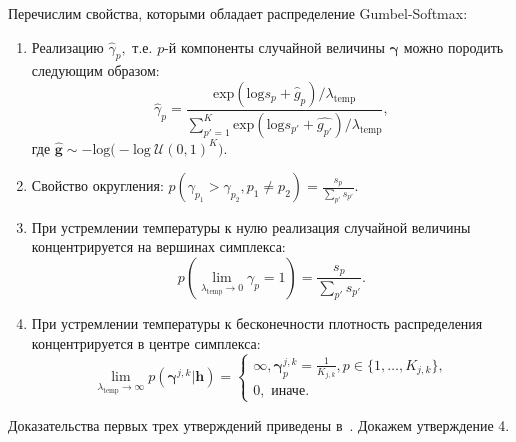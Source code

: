 Перечислим свойства, которыми обладает распределение Gumbel-Softmax:
\begin{enumerate}
\item Реализацию $\hat{\gamma}_p,$ т.е. $p$-й компоненты случайной величины $\boldsymbol{\gamma}$  можно породить следующим образом:
\[
    \hat{\gamma}_p = \frac{\text{exp}(\text{log}s_p+\hat{g}_p)/\lambda_{\text{temp}}}{\sum_{p'=1}^{K}\text{exp}(\text{log}s_{p'}+\hat{g_{p'}})/\lambda_{\text{temp}}},
\]
где $\hat{\mathbf{g}} \sim -\text{log}\bigl(-\text{log}~\mathcal{U}(0,1)^K\bigr).$ 

\item Свойство округления: $p(\gamma_{p_1} > \gamma_{p_2}, p_1\neq p_2) = \frac{s_p}{\sum_{p'}s_{p'}}.$

\item При устремлении температуры к нулю реализация случайной величины концентрируется на вершинах симплекса:
\[
    p(\lim_{\lambda_{\text{temp}} \to 0}  \gamma_{p} = 1)  = \frac{s_p}{\sum_{p'}s_{p'}}.
\]


\item При устремлении температуры к бесконечности плотность распределения концентрируется в центре симплекса:
\begin{equation}
\label{eq:theorem_gs}
    \lim_{\lambda_{\text{temp}} \to \infty}  p(\boldsymbol{\gamma}^{j,k}|\mathbf{h}) = 
    \begin{cases}
    \infty, \boldsymbol{\gamma}^{j,k}_p = \frac{1}{K_{j,k}}, p \in \{1,\dots,K_{j,k}\},\\
    0, \text{ иначе.}
    \end{cases}
\end{equation}
\end{enumerate}

Доказательства первых трех утверждений приведены в~\cite{gumbel}. Докажем утверждение 4.

